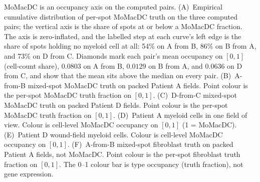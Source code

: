 MoMacDC is an occupancy axis on the computed pairs. (A)~Empirical cumulative distribution of per-spot MoMacDC truth on the three computed pairs; the vertical axis is the share of spots at or below a MoMacDC fraction. The axis is zero-inflated, and the labelled step at each curve's left edge is the share of spots holding no myeloid cell at all: 54\% on A from B, 86\% on B from A, and 73\% on D from C. Diamonds mark each pair's mean occupancy on \([0,1]\) (cell-count share), \(0.0803\) on A from B, \(0.0129\) on B from A, and \(0.0636\) on D from C, and show that the mean sits above the median on every pair. (B)~A-from-B mixed-spot MoMacDC truth on packed Patient A fields. Point colour is the per-spot MoMacDC truth fraction on \([0,1]\). (C)~D-from-C mixed-spot MoMacDC truth on packed Patient D fields. Point colour is the per-spot MoMacDC truth fraction on \([0,1]\). (D)~Patient A myeloid cells in one field of view. Colour is cell-level MoMacDC occupancy on \([0,1]\) (1 = MoMacDC). (E)~Patient D wound-field myeloid cells. Colour is cell-level MoMacDC occupancy on \([0,1]\). (F)~A-from-B mixed-spot fibroblast truth on packed Patient A fields, not MoMacDC. Point colour is the per-spot fibroblast truth fraction on \([0,1]\). The 0--1 colour bar is type occupancy (truth fraction), not gene expression.
